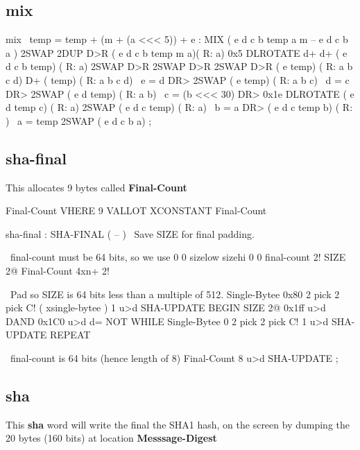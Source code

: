 \subsection{mix}
\begin{chunk}{mix}
\  temp = temp + (m + (a <<< 5)) + e
: MIX ( e d c b temp a m -- e d c b a )
    2SWAP 2DUP D>R                   ( e d c b temp m a)( R: a)
    0x5 DLROTATE d+ d+               ( e d c b temp)    ( R: a)
    2SWAP D>R  2SWAP D>R  2SWAP D>R  ( e temp)    ( R: a b c d)
    D+                               ( temp)      ( R: a b c d)
    \  e = d
       DR> 2SWAP                     ( e temp)      ( R: a b c)
    \  d = c
       DR> 2SWAP                     ( e d temp)      ( R: a b)
    \  c = (b <<< 30)
       DR> 0x1e DLROTATE             ( e d temp c)      ( R: a)
       2SWAP                         ( e d c temp)      ( R: a)
    \  b = a
       DR>                           ( e d c temp b)     ( R: )
    \  a = temp
       2SWAP                         ( e d c b a)
    ;

\end{chunk}

\subsection{sha-final}

This allocates 9 bytes called {\bf Final-Count}
\begin{chunk}{Final-Count}
VHERE 9 VALLOT
XCONSTANT Final-Count

\end{chunk}
\begin{chunk}{sha-final}
: SHA-FINAL         ( -- )
    \  Save SIZE for final padding.
    
    \ final-count must be 64 bits, so we use 0 0 sizelow sizehi
    0 0 final-count 2!
    SIZE 2@
    Final-Count 4xn+ 2!

    \  Pad so SIZE is 64 bits less than a multiple of 512.
    Single-Bytee 0x80 2 pick 2 pick C!   ( xsingle-bytee )
    1 u>d SHA-UPDATE
    BEGIN  SIZE 2@ 0x1ff u>d DAND 0x1C0 u>d d= NOT WHILE
        Single-Bytee 0 2 pick 2 pick C!  1 u>d SHA-UPDATE
    REPEAT

    \ final-count is 64 bits (hence length of 8)
    Final-Count 8 u>d SHA-UPDATE
    ;

\end{chunk}

\subsection{sha}
This {\bf sha} word will write the final the SHA1 hash, on
the screen by dumping the 20 bytes (160 bits) 
at location {\bf Messsage-Digest}

